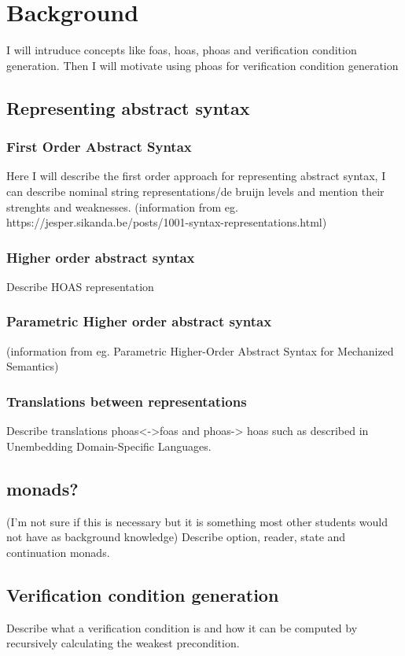 \chapter{Background}
\label{cha:1}
I will intruduce concepts like foas, hoas, phoas and verification condition generation. Then I will motivate using phoas for verification condition generation

\section{Representing abstract syntax}

\subsection{First Order Abstract Syntax}
Here I will describe the first order approach for representing abstract syntax, I can describe nominal string representations/de bruijn levels and mention their strenghts and weaknesses. (information from eg. https://jesper.sikanda.be/posts/1001-syntax-representations.html)
\subsection{Higher order abstract syntax}
Describe HOAS representation 



\subsection{Parametric Higher order abstract syntax}

(information from eg. Parametric Higher-Order Abstract Syntax for Mechanized
Semantics)

\subsection{Translations between representations}
Describe translations phoas<->foas and phoas-> hoas such as described in Unembedding Domain-Specific Languages.


\section{monads?}
(I'm not sure if this is necessary but it is something most other students would not have as background knowledge)
Describe option, reader, state and continuation monads.

\section{Verification condition generation}
Describe what a verification condition is and how it can be computed by recursively calculating the weakest precondition.

